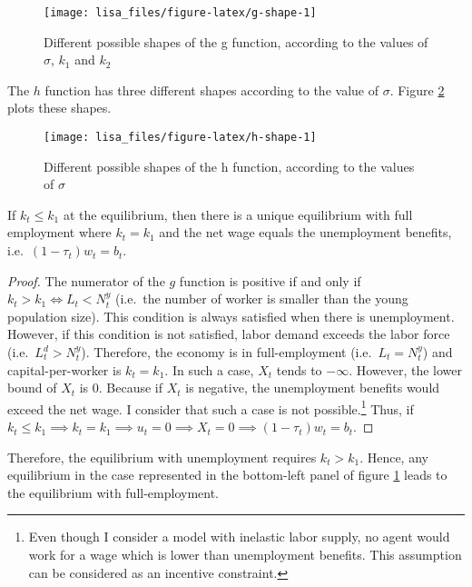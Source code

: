 \documentclass[
]{article}
\let\BeginKnitrBlock\begin \let\EndKnitrBlock\end
\begin{document}
\begin{figure}[!tb]

{\centering \texttt{[image: lisa\_files/figure-latex/g-shape-1]} 

}

\caption{Different possible shapes of the g function, according to the values of $\sigma$, $k_1$ and $k_2$}\label{fig:g-shape}
\end{figure}

The \(h\) function has three different shapes according to the value of \(\sigma\). Figure \ref{fig:h-shape} plots these shapes.

\begin{figure}[!tb]

{\centering \texttt{[image: lisa\_files/figure-latex/h-shape-1]} 

}

\caption{Different possible shapes of the h function, according to the values of $\sigma$}\label{fig:h-shape}
\end{figure}

\BeginKnitrBlock{proposition}
\protect\hypertarget{prp:full-emp}{}{\label{prp:full-emp} }If \(k_t \leq k_1\) at the equilibrium, then there is a unique equilibrium with full employment where \(k_t = k_1\) and the net wage equals the unemployment benefits, i.e.~\((1-\tau_t)w_t = b_t\).
\EndKnitrBlock{proposition}

\BeginKnitrBlock{proof}
\iffalse{} {Proof. } \fi{}The numerator of the \(g\) function is positive if and only if \(k_t > k_1 \Leftrightarrow L_t < N_t^y\) (i.e.~the number of worker is smaller than the young population size). This condition is always satisfied when there is unemployment. However, if this condition is not satisfied, labor demand exceeds the labor force (i.e.~\(L_t^d > N_t^y\)). Therefore, the economy is in full-employment (i.e.~\(L_t = N_t^y\)) and capital-per-worker is \(k_t = k_1\). In such a case, \(X_t\) tends to \(-\infty\). However, the lower bound of \(X_t\) is \(0\). Because if \(X_t\) is negative, the unemployment benefits would exceed the net wage. I consider that such a case is not possible.\footnote{Even though I consider a model with inelastic labor supply, no agent would work for a wage which is lower than unemployment benefits. This assumption can be considered as an incentive constraint.} Thus, if \(k_t \leq k_1 \implies k_t = k_1 \implies u_t = 0 \implies X_t = 0 \implies (1-\tau_t)w_t = b_t\).
\EndKnitrBlock{proof}

Therefore, the equilibrium with unemployment requires \(k_t > k_1\). Hence, any equilibrium in the case represented in the bottom-left panel of figure \ref{fig:g-shape} leads to the equilibrium with full-employment.
\end{document}
